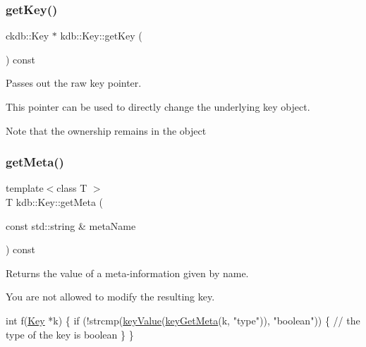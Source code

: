 \subsubsection{\texorpdfstring{get\+Key()}{getKey()}}
{\footnotesize\ttfamily ckdb\+::\+Key $\ast$ kdb\+::\+Key\+::get\+Key (\begin{DoxyParamCaption}{ }\end{DoxyParamCaption}) const\hspace{0.3cm}{\ttfamily [inline]}}



Passes out the raw key pointer. 

This pointer can be used to directly change the underlying key object.

\begin{DoxyNote}{Note}
that the ownership remains in the object 
\end{DoxyNote}
\mbox{\label{classkdb_1_1Key_acdd4e81b0565756c99826bf926fd6fe4}} 
\subsubsection{\texorpdfstring{get\+Meta()}{getMeta()}}
{\footnotesize\ttfamily template$<$class T $>$ \\
T kdb\+::\+Key\+::get\+Meta (\begin{DoxyParamCaption}\item[{const std\+::string \&}]{meta\+Name }\end{DoxyParamCaption}) const\hspace{0.3cm}{\ttfamily [inline]}}



Returns the value of a meta-\/information given by name. 

You are not allowed to modify the resulting key.


\begin{DoxyCode}
\textcolor{keywordtype}{int} f(\hyperlink{classkdb_1_1Key_a5679f5cae63caddd64a60388b9cc77fa}{Key} *k)
\{
        \textcolor{keywordflow}{if} (!strcmp(\hyperlink{group__keyvalue_ga6f29609c5da53c6dc26a98678d5752af}{keyValue}(\hyperlink{group__keymeta_ga9ed3875495ddb3d8a8d29158a60a147c}{keyGetMeta}(k, \textcolor{stringliteral}{"type"})), \textcolor{stringliteral}{"boolean"}))
        \{
                \textcolor{comment}{// the type of the key is boolean}
        \}
\}
\end{DoxyCode}


